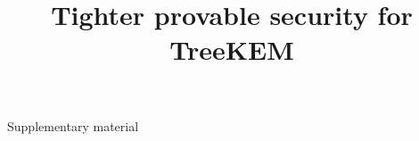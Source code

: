 \documentclass{llncs}
\title{Tighter provable security for TreeKEM}
\author{}
\institute{}
\begin{document}
\maketitle

\pagestyle{plain}











\newpage




\newpage

\begin{center}
	{\LARGE Supplementary material}
\end{center}

\appendix


\end{document}
